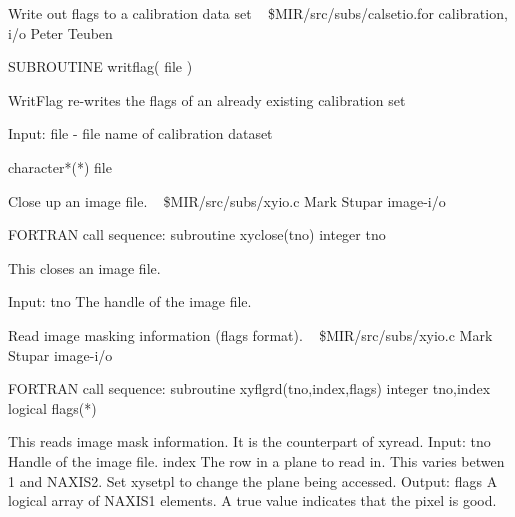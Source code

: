 %
\noindent Write out flags to a calibration data set
\newline \ 
\newline {} \$MIR/src/subs/calsetio.for
\newline {} calibration, i/o
\newline {} Peter Teuben
\par{\tenpoint
{\eightpoint\begintt
        SUBROUTINE writflag( file )

   WritFlag re-writes the flags of an already existing calibration
   set

   Input:
       file  - file name of calibration dataset

        character*(*) file
\endtt}
\par}
%
\noindent Close up an image file.
\newline \ 
\newline {} \$MIR/src/subs/xyio.c
\newline {} Mark Stupar
\newline \abox{Keywords:} image-i/o
\par{\tenpoint
{\eightpoint\begintt
FORTRAN call sequence:
        subroutine xyclose(tno)
        integer tno

  This closes an image file.

  Input:
    tno         The handle of the image file.                           
\endtt}
\par}
%
\noindent Read image masking information (flags format).
\newline \ 
\newline {} \$MIR/src/subs/xyio.c
\newline \abox{Responsible:} Mark Stupar
\newline {} image-i/o
\par{\tenpoint
{\eightpoint\begintt
FORTRAN call sequence:
        subroutine xyflgrd(tno,index,flags)
        integer tno,index
        logical flags(*)

  This reads image mask information. It is the counterpart of xyread.
  Input:
    tno         Handle of the image file.
    index       The row in a plane to read in. This varies betwen 1 and
                NAXIS2. Set xysetpl to change the plane being accessed.
  Output:
    flags       A logical array of NAXIS1 elements. A true value indicates
                that the pixel is good.                                 
\endtt}
\par}
